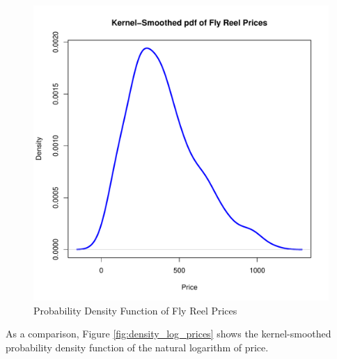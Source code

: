 \begin{figure}[h!]
  \centering
  \includegraphics[scale = 0.5, keepaspectratio=true]{../Figures/density_prices}
  \caption{Probability Density Function of Fly Reel Prices} \label{fig:density_prices}
\end{figure}



\pagebreak
As a comparison, Figure \ref{fig:density_log_prices} shows the kernel-smoothed probability density function of the natural logarithm of
price.

